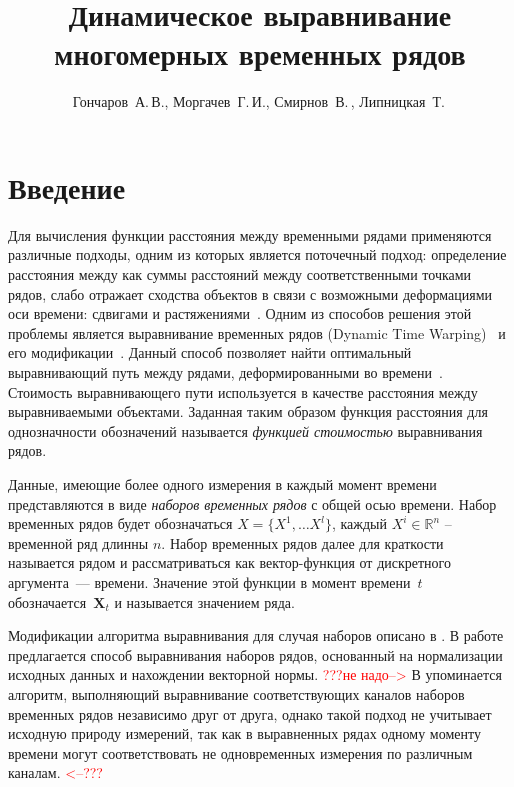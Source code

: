 \documentclass[12pt,twoside]{article}
\title
        {Динамическое выравнивание многомерных временных рядов}
\author
        {Гончаров~А.\,В., Моргачев~Г.\,И., Смирнов~В.\,, Липницкая~Т.\,} %
\newcommand{\fixme}[1]{\textcolor{red}{#1}}
\renewcommand{\baselinestretch}{1.34}
\begin{document}
    \renewcommand{\baselinestretch}{1.34}
    \maketitle
    \setcounter{secnumdepth}{3}
    \section{Введение}\label{intro}
        
        Для вычисления функции расстояния между временными рядами применяются различные подходы, одним из которых является поточечный подход: определение расстояния между как суммы расстояний между соответственными точками рядов, слабо отражает сходства объектов в связи с возможными деформациями оси времени: сдвигами и растяжениями~\cite{01f4ab11a9ff49ff909094a135dcfe33}.
        Одним из способов решения этой проблемы является выравнивание временных рядов (Dynamic Time Warping)~\cite{Keogh:1999:SUD:645803.669511} и его модификации~\cite{journals/ida/SalvadorC07,Keogh01derivativedynamic}.
        Данный способ позволяет найти оптимальный выравнивающий путь между рядами, деформированными во времени~\cite{salvador2004fastdtw}. Стоимость выравнивающего пути используется в качестве расстояния между выравниваемыми объектами. Заданная таким образом функция расстояния для однозначности обозначений называется \textit{функцией стоимостью} выравнивания рядов.
        
        Данные, имеющие более одного измерения в каждый момент времени представляются в виде \textit{наборов временных рядов} с общей осью времени. Набор временных рядов будет обозначаться $X = \{X^1,\dots X^l\}$, каждый $X^i \in \mathbb{R}^{n}$ \--- временной ряд длинны $n$. Набор временных рядов далее для краткости называется рядом и рассматриваться как вектор-функция от дискретного аргумента~--- времени. Значение этой функции в момент времени~$t$ обозначается~$\mathbf{X}_t$ и называется значением ряда.
        
        Модификации алгоритма выравнивания для случая наборов описано в \cite{Holt2007,Sanguansat2012MultipleMS}.
        В работе \cite{Holt2007} предлагается способ выравнивания наборов рядов, основанный на нормализации исходных данных и нахождении векторной нормы.
        \fixme{???не надо-->} В \cite{Sanguansat2012MultipleMS} упоминается алгоритм, выполняющий выравнивание соответствующих каналов наборов временных рядов независимо друг от друга, однако такой подход не учитывает исходную природу измерений, так как в выравненных рядах одному моменту времени могут соответствовать не одновременных измерения по различным каналам. \fixme{<--???}
        
\end{document}
